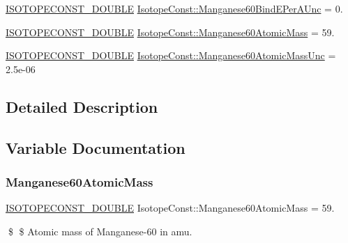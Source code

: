 \begin{DoxyCompactItemize}
\mbox{\hyperlink{group___isotope_const-_macros_ga8f45a7272ce02c0b4c65c44636ed719a}{I\+S\+O\+T\+O\+P\+E\+C\+O\+N\+S\+T\+\_\+\+D\+O\+U\+B\+LE}} \mbox{\hyperlink{group___isotope_const-_manganese-_mn60_gac9afe57951a1fc952273b2a07761190a}{Isotope\+Const\+::\+Manganese60\+Bind\+E\+Per\+A\+Unc}} = 0.
\item 
\mbox{\hyperlink{group___isotope_const-_macros_ga8f45a7272ce02c0b4c65c44636ed719a}{I\+S\+O\+T\+O\+P\+E\+C\+O\+N\+S\+T\+\_\+\+D\+O\+U\+B\+LE}} \mbox{\hyperlink{group___isotope_const-_manganese-_mn60_ga14b661b1035ee06c8bbc98a3a7f48e14}{Isotope\+Const\+::\+Manganese60\+Atomic\+Mass}} = 59.
\item 
\mbox{\hyperlink{group___isotope_const-_macros_ga8f45a7272ce02c0b4c65c44636ed719a}{I\+S\+O\+T\+O\+P\+E\+C\+O\+N\+S\+T\+\_\+\+D\+O\+U\+B\+LE}} \mbox{\hyperlink{group___isotope_const-_manganese-_mn60_ga90d33f9709db77c657b815737f845038}{Isotope\+Const\+::\+Manganese60\+Atomic\+Mass\+Unc}} = 2.\+5e-\/06
\end{DoxyCompactItemize}


\subsection{Detailed Description}


\subsection{Variable Documentation}
\mbox{\label{group___isotope_const-_manganese-_mn60_ga14b661b1035ee06c8bbc98a3a7f48e14}} 
\subsubsection{\texorpdfstring{Manganese60\+Atomic\+Mass}{Manganese60AtomicMass}}
{\footnotesize\ttfamily \mbox{\hyperlink{group___isotope_const-_macros_ga8f45a7272ce02c0b4c65c44636ed719a}{I\+S\+O\+T\+O\+P\+E\+C\+O\+N\+S\+T\+\_\+\+D\+O\+U\+B\+LE}} Isotope\+Const\+::\+Manganese60\+Atomic\+Mass = 59.}

\$ \$ Atomic mass of Manganese-\/60 in amu. \mbox{\label{group___isotope_const-_manganese-_mn60_ga90d33f9709db77c657b815737f845038}} 
